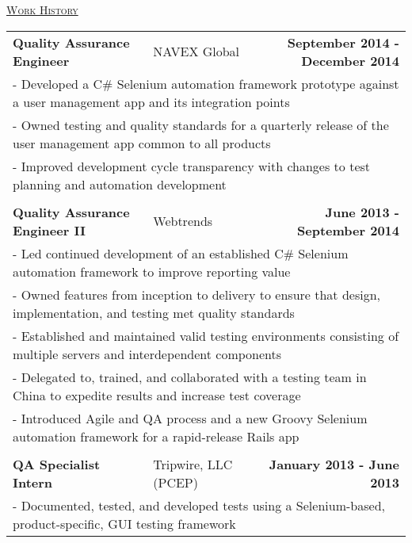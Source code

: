 \documentclass[letterpaper]{article}
\begin{document}
	\begin{center}
		\underline{\large \scshape Work History} \\
		\begin{tabular}{p{}p{}r}
			\\
				\textbf{Quality Assurance Engineer}									&
				NAVEX Global										&
				\textbf{September 2014 - December 2014}
			\\
				\multicolumn{3}{p{\textwidth}}{\quad\quad - Developed a C\# Selenium automation framework prototype against a user management app and its integration points} 
			\\
				\multicolumn{3}{p{\textwidth}}{\quad\quad - Owned testing and quality standards for a quarterly release of the user management app common to all products} 
			\\
				\multicolumn{3}{p{\textwidth}}{\quad\quad - Improved development cycle transparency with changes to test planning and automation development} 
			\\
			\\
				\textbf{Quality Assurance Engineer II}					&
				Webtrends							&
				\textbf{June 2013 - September 2014}
			\\
				\multicolumn{3}{p{\textwidth}}{\quad\quad - Led continued development of an established C\# Selenium automation framework to improve reporting value}
			\\
				\multicolumn{3}{p{\textwidth}}{\quad\quad - Owned features from inception to delivery to ensure that design, implementation, and testing met quality standards} 
			\\
				\multicolumn{3}{p{\textwidth}}{\quad\quad - Established and maintained valid testing environments consisting of multiple servers and interdependent components} 
			\\
				\multicolumn{3}{p{\textwidth}}{\quad\quad - Delegated to, trained, and collaborated with a testing team in China to expedite results and increase test coverage}
			\\
				\multicolumn{3}{p{\textwidth}}{\quad\quad - Introduced Agile and QA process and a new Groovy Selenium automation framework for a rapid-release Rails app}  
			\\
			\\
				\textbf{QA Specialist Intern}					&
				Tripwire, LLC (PCEP)							&
				\textbf{January 2013 - June 2013}
			\\
				\multicolumn{3}{p{\textwidth}}{\quad\quad - Documented, tested, and developed tests using a Selenium-based, product-specific, GUI testing framework}

\end{tabular}
\end{center}
\end{document}
